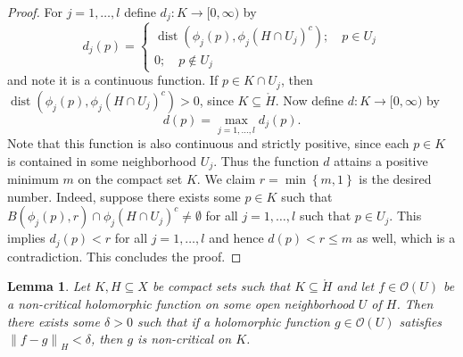 \documentclass[a4paper,11pt]{amsart}
\newcommand{\set}[1]{\left\{#1\right\}}
\newcommand{\norm}[1]{\left\lVert#1\right\rVert}
\DeclareMathOperator{\dist}{dist}
\newtheorem{lemma}{Lemma}
\begin{document}
\begin{proof} 
    For $j = 1, \ldots, l$ define $d_j \colon K \to [0, \infty)$ by 
    \[d_j(p) = \begin{cases} 
    \dist(\phi_j(p), \phi_j(H \cap U_j)^c); \quad p \in U_j \\
    0; \quad p \notin U_j
    \end{cases}\] 
    and note it is a continuous function. If $p \in K \cap U_j$, then $\dist(\phi_j(p), \phi_j(H \cap U_j)^c) > 0$, since $K \subseteq \mathring{H}$.
    Now define $d \colon K \to [0, \infty)$ by 
    \[d(p) = \max_{j=1,\ldots,l} d_j(p).\]
    Note that this function is also continuous and strictly positive, since each $p \in K$ is contained in some neighborhood $U_j$.
    Thus the function $d$ attains a positive minimum $m$ on the compact set $K$. We claim $r = \min \set{m,1}$ is the desired number. 
    Indeed, suppose there exists some $p \in K$ such that $B(\phi_j(p),r) \cap \phi_j(H \cap U_j)^c \neq \emptyset$ for all $j = 1, \ldots, l$ such that $p \in U_j$.
    This implies $d_j(p) < r$ for all $j = 1, \ldots, l$ and hence $d(p) < r \le m$ as well, which is a contradiction. This concludes the proof.
\end{proof}

\begin{lemma}\label{MergelyanSetup}
    Let $K, H \subseteq X$ be compact sets such that $K \subseteq \mathring{H}$ and let $f \in \mathcal{O}(U)$ be a non-critical holomorphic function on some open neighborhood $U$ of $H$.
    Then there exists some $\delta > 0$ such that if a holomorphic function $g \in \mathcal{O}(U)$ satisfies $\norm{f-g}_{H} < \delta$, then $g$ is non-critical on $K$.
\end{lemma}
\end{document}
